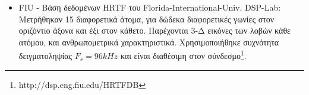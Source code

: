 \begin{itemize}
   \item FIU - Βάση δεδομένων HRTF του Florida-International-Univ. DSP-Lab: Μετρήθηκαν 15 διαφορετικά άτομα, για δώδεκα διαφορετικές γωνίες στον οριζόντιο άξονα και έξι στον κάθετο. Παρέχονται 3-Δ εικόνες των λοβών κάθε ατόμου, και ανθρωπομετρικά χαρακτηριστικά. Χρησιμοποιήθηκε συχνότητα δειγματοληψίας $F_s = 96 kHz$ και είναι διαθέσιμη στον σύνδεσμο\footnote{http://dsp.eng.fiu.edu/HRTFDB}.
\end{itemize}